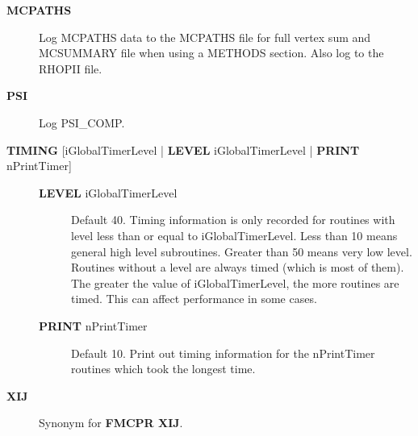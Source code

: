 \documentclass[openany,a4paper,10pt]{manual}
\begin{document}
\begin{description}
\item[\textbf{MCPATHS}]
Log MCPATHS data to the MCPATHS file for full vertex sum and MCSUMMARY
file when using a METHODS section.  Also log to the RHOPII file.

\item[\textbf{PSI}]
Log PSI\_COMP.

\item[\textbf{TIMING} {[}iGlobalTimerLevel | \textbf{LEVEL} iGlobalTimerLevel | \textbf{PRINT} nPrintTimer{]}]\begin{description}
\item[\textbf{LEVEL} iGlobalTimerLevel]
Default 40.
Timing information is only recorded for routines with level less than
or equal to iGlobalTimerLevel.  Less than 10 means general high level
subroutines. Greater than 50 means very low level.  Routines without
a level are always timed (which is most of them).  The greater the value
of iGlobalTimerLevel, the more routines are timed.  This can affect
performance in some cases.

\item[\textbf{PRINT} nPrintTimer]
Default 10.
Print out timing information for the nPrintTimer routines which took the longest time.

\end{description}

\item[\textbf{XIJ}]
Synonym for \textbf{FMCPR XIJ}.

\end{description}
\end{document}

